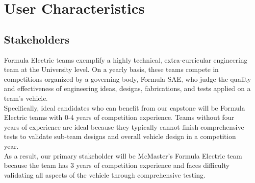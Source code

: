 \documentclass[12pt]{article}
\begin{document}
\section{User Characteristics}

\subsection{Stakeholders}

Formula Electric teams exemplify a highly technical, extra-curricular engineering
team at the University level. On a yearly basis, these teams compete in 
competitions organized by a governing body, Formula SAE, who judge the quality
and effectiveness of engineering ideas, designs, fabrications, and tests applied
on a team’s vehicle.\\ 

Specifically, ideal candidates who can benefit from our capstone will be Formula
Electric teams with 0-4 years of competition experience. Teams without
four years of experience are ideal because they typically cannot finish comprehensive 
tests to validate sub-team designs and overall vehicle design in a
competition year.\\ 

As a result, our primary stakeholder will be McMaster’s Formula Electric
team because the team has 3 years of competition experience and faces difficulty
validating all aspects of the vehicle through comprehensive testing.

\newpage
\end{document}
